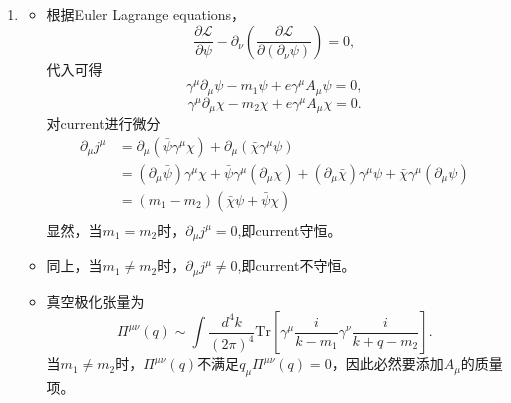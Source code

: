 \documentclass{article}
\begin{document}
\begin{enumerate}
  \item \begin{itemize}
    \item [a.]
根据Euler Lagrange equations，
  \begin{equation}
    \frac{\partial \mathcal{L}}{\partial \psi}-\partial_\nu\left(\frac{\partial \mathcal{L}}{\partial(\partial_\nu \psi)}\right)=0,
  \end{equation}
  代入可得
  \begin{equation}
    \gamma^\mu\partial_\mu \psi-m_1\psi+e\gamma^\mu A_\mu\psi=0,
  \end{equation}
  \begin{equation}
    \gamma^\mu\partial_\mu \chi-m_2\chi+e\gamma^\mu A_\mu\chi=0.    
  \end{equation}
  对current进行微分
  \begin{equation}
    \begin{aligned}
      \partial_\mu j^\mu&=\partial_\mu\left(\bar{\psi}\gamma^\mu\chi\right)+\partial_\mu\left(\bar{\chi}\gamma^\mu\psi\right)\\
      &=\left(\partial_\mu \bar{\psi}\right)\gamma^\mu\chi+\bar{\psi}\gamma^\mu\left(\partial_\mu \chi\right)+\left(\partial_\mu \bar{\chi}\right)\gamma^\mu\psi+\bar{\chi}\gamma^\mu\left(\partial_\mu \psi\right)\\
      &=(m_1-m_2)\left(\bar\chi\psi+\bar\psi\chi\right)\\
    \end{aligned}
  \end{equation}
  显然，当$m_1=m_2$时，$\partial_\mu j^\mu=0$,即current守恒。
  \item [b.]同上，当$m_1\neq m_2$时，$\partial_\mu j^\mu\ne 0$,即current不守恒。
  \item [c.]真空极化张量为
  \begin{equation}
    \Pi^{\mu\nu}(q)\sim \int \frac{d^4k}{(2\pi)^4}\mathrm{Tr}\left[\gamma^\mu\frac{i}{{k}-m_1}\gamma^\nu\frac{i}{{k}+{q}-m_2}\right].
  \end{equation}
  当$m_1\ne m_2$时，$\Pi^{\mu\nu}(q)$不满足$q_\mu \Pi^{\mu\nu}(q)=0$，因此必然要添加$A_\mu$的质量项。
  \end{itemize}


\end{enumerate}
\end{document}
